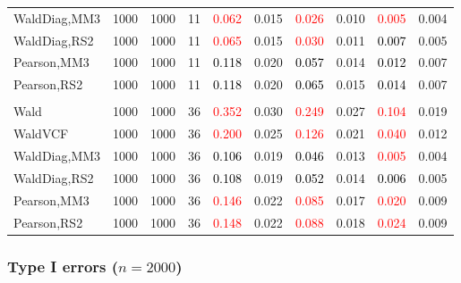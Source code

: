 \documentclass[
]{article}
\begin{document}
\begin{table}[H]
{\begin{tabular}[t]{lrrrrrrlrr}
\hspace{1em}WaldDiag,MM3 & 1000 & 1000 & 11 & \textcolor{red}{0.062} & 0.015 & \textcolor{red}{0.026} & 0.010 & \textcolor{red}{0.005} & 0.004\\
\hspace{1em}WaldDiag,RS2 & 1000 & 1000 & 11 & \textcolor{red}{0.065} & 0.015 & \textcolor{red}{0.030} & 0.011 & \textcolor{black}{0.007} & 0.005\\
\hspace{1em}Pearson,MM3 & 1000 & 1000 & 11 & \textcolor{black}{0.118} & 0.020 & \textcolor{black}{0.057} & 0.014 & \textcolor{black}{0.012} & 0.007\\
\hspace{1em}Pearson,RS2 & 1000 & 1000 & 11 & \textcolor{black}{0.118} & 0.020 & \textcolor{black}{0.065} & 0.015 & \textcolor{black}{0.014} & 0.007\\
\addlinespace[0.3em]
\multicolumn{10}{l}{\textbf{3F 15V}}\\
\hspace{1em}Wald & 1000 & 1000 & 36 & \textcolor{red}{0.352} & 0.030 & \textcolor{red}{0.249} & 0.027 & \textcolor{red}{0.104} & 0.019\\
\hspace{1em}WaldVCF & 1000 & 1000 & 36 & \textcolor{red}{0.200} & 0.025 & \textcolor{red}{0.126} & 0.021 & \textcolor{red}{0.040} & 0.012\\
\hspace{1em}WaldDiag,MM3 & 1000 & 1000 & 36 & \textcolor{black}{0.106} & 0.019 & \textcolor{black}{0.046} & 0.013 & \textcolor{red}{0.005} & 0.004\\
\hspace{1em}WaldDiag,RS2 & 1000 & 1000 & 36 & \textcolor{black}{0.108} & 0.019 & \textcolor{black}{0.052} & 0.014 & \textcolor{black}{0.006} & 0.005\\
\hspace{1em}Pearson,MM3 & 1000 & 1000 & 36 & \textcolor{red}{0.146} & 0.022 & \textcolor{red}{0.085} & 0.017 & \textcolor{red}{0.020} & 0.009\\
\hspace{1em}Pearson,RS2 & 1000 & 1000 & 36 & \textcolor{red}{0.148} & 0.022 & \textcolor{red}{0.088} & 0.018 & \textcolor{red}{0.024} & 0.009\\
\bottomrule
\end{tabular}}
\endgroup{}
\end{table}

\hypertarget{type-i-errors-n2000-3}{%
\subsubsection{\texorpdfstring{Type I errors
(\(n=2000\))}{Type I errors (n=2000)}}\label{type-i-errors-n2000-3}}
\end{document}
